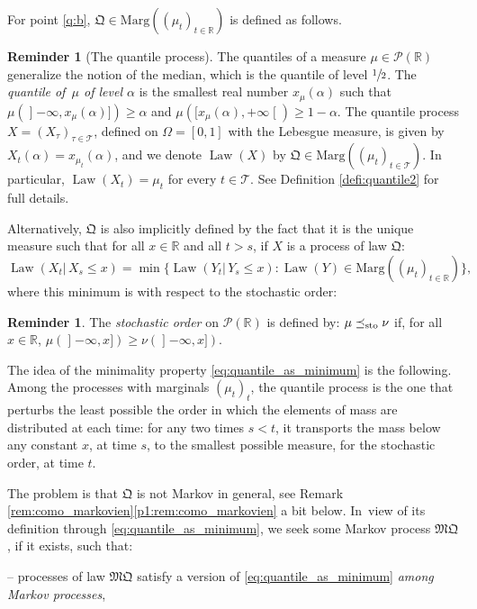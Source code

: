\documentclass[11pt]{article}
\theoremstyle{plain}
\theoremstyle{definition}
\newtheorem{reminder}[them]{Reminder}
\newcommand{\como}{\mathfrak{Q}}
\newcommand{\mq}{\mathfrak{MQ}}
\newcommand{\Tt}{{\mathcal T}}
\newcommand{\p}{\mathcal{P}}
\newcommand{\ma}{\mathrm{Marg}}
\newcommand{\R}{\mathbb{R}}
\newcommand{\law}{\operatorname{Law}}
\newcommand{\leqs}{\preceq_{\text{\rm sto}}}
\newcommand{\op}{\mathopen}
\newcommand{\clo}{\mathclose}
\begin{document}
For point \eqref{q:b}, $\como\in\ma((\mu_t)_{t\in\R})$ is defined as follows.

\begin{reminder}[The quantile process]\label{remind:quantile}The quantiles of a measure $\mu\in\p(\R)$ generalize the notion of the median, which is the quantile of level $\sfrac{1}{2}$.
The \emph{quantile of~$\mu$ of level $\alpha$} is the smallest real number $x_\mu(\alpha)$ such that $\mu(\op]-\infty,x_\mu(\alpha)])\geq \alpha$ and $\mu([x_\mu(\alpha),+\infty\clo[)\geq 1-\alpha$.
The quantile process $X=(X_\tau)_{\tau\in \Tt}$, defined on $\Omega=[0,1]$ with the Lebesgue measure, is given by $X_t(\alpha)=x_{\mu_t}(\alpha)$, and we denote $\law(X)$ by $\como\in \ma((\mu_t)_{t\in \Tt})$. In particular, $\law(X_t)=\mu_t$ for every $t\in \Tt$. See Definition \ref{defi:quantile2} for full details.
\end{reminder}

Alternatively, $\como$ is also implicitly defined by the fact that it is the unique measure such that for all $x\in\R$ and all $t>s$, if $X$ is a process of law $\como$:
\begin{equation}\label{eq:quantile_as_minimum}\law(X_{t}|\,X_{s}\leqslant x)=\min\{\law(Y_{t}|\,Y_{s}\leqslant x): \law(Y)\in\ma((\mu_t)_{t\in\R})\},
\end{equation}
where this minimum is with respect to the stochastic order:

\begin{reminder}\label{remind:sto} The \emph{stochastic order} on $\p(\R)$ is defined by: $\mu\leqs\nu$ if, for all $x\in\R$, $\mu(\op]-\infty,x])\geqslant\nu(\op]-\infty,x])$.
\end{reminder}

The idea of the minimality property \eqref{eq:quantile_as_minimum} is the following. Among the processes with marginals $(\mu_t)_t$, the quantile process is the one that perturbs the least possible the order in which the elements of mass are distributed at each time: for any two times $s<t$, it transports the mass below any constant $x$, at time $s$, to the smallest possible measure, for the stochastic order, at time $t$.

The problem is that $\como$ is not Markov in general, see Remark \ref{rem:como_markovien}\eqref{p1:rem:como_markovien} a bit below. In~view of its definition through \eqref{eq:quantile_as_minimum}, we seek some Markov process $\mq$, if it exists, such that:

-- processes of law $\mq$ satisfy a version of \eqref{eq:quantile_as_minimum} \emph{among Markov processes},
\end{document}
